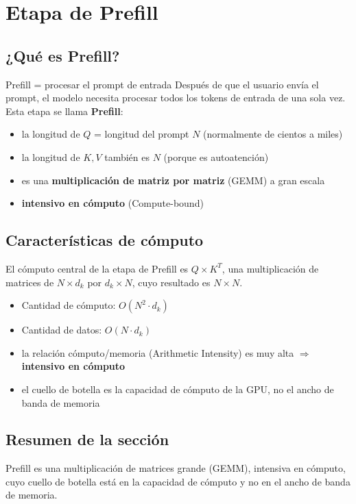\section{Etapa de Prefill}

\subsection{¿Qué es Prefill?}

\begin{importantbox}{Prefill = procesar el prompt de entrada}
Después de que el usuario envía el prompt, el modelo necesita procesar todos los tokens de entrada de una sola vez. Esta etapa se llama \textbf{Prefill}:
\begin{itemize}
  \item la longitud de $Q$ = longitud del prompt $N$ (normalmente de cientos a miles)
  \item la longitud de $K, V$ también es $N$ (porque es autoatención)
  \item es una \textbf{multiplicación de matriz por matriz} (GEMM) a gran escala
  \item \textbf{intensivo en cómputo} (Compute-bound)
\end{itemize}
\end{importantbox}

\subsection{Características de cómputo}

El cómputo central de la etapa de Prefill es $Q \times K^T$, una multiplicación de matrices de $N \times d_k$ por $d_k \times N$, cuyo resultado es $N \times N$.

\begin{itemize}
  \item Cantidad de cómputo: $O(N^2 \cdot d_k)$
  \item Cantidad de datos: $O(N \cdot d_k)$
  \item la relación cómputo/memoria (Arithmetic Intensity) es muy alta $\Rightarrow$ \textbf{intensivo en cómputo}
  \item el cuello de botella es la capacidad de cómputo de la GPU, no el ancho de banda de memoria
\end{itemize}

\subsection{Resumen de la sección}

Prefill es una multiplicación de matrices grande (GEMM), intensiva en cómputo, cuyo cuello de botella está en la capacidad de cómputo y no en el ancho de banda de memoria.
